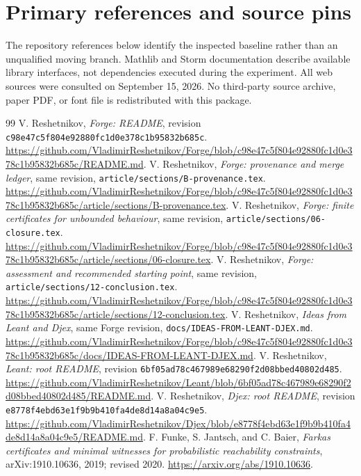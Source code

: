 \documentclass[11pt,letterpaper]{article}
\theoremstyle{definition}\newtheorem{definition}[theorem]{Definition}
\theoremstyle{remark}\newtheorem{remark}[theorem]{Remark}
\newcommand{\code}[1]{\texttt{#1}}
\begin{document}
\section{Primary references and source pins}
The repository references below identify the inspected baseline rather than an unqualified moving branch. Mathlib and Storm documentation describe available library interfaces, not dependencies executed during the experiment. All web sources were consulted on September 15, 2026. No third-party source archive, paper PDF, or font file is redistributed with this package.

\begingroup\small
\begin{thebibliography}{99}
 V. Reshetnikov, \emph{Forge: README}, revision \code{c98e47c5f804e92880fc1d0e378c1b95832b685c}. \url{https://github.com/VladimirReshetnikov/Forge/blob/c98e47c5f804e92880fc1d0e378c1b95832b685c/README.md}.
 V. Reshetnikov, \emph{Forge: provenance and merge ledger}, same revision, \code{article/sections/B-provenance.tex}. \url{https://github.com/VladimirReshetnikov/Forge/blob/c98e47c5f804e92880fc1d0e378c1b95832b685c/article/sections/B-provenance.tex}.
 V. Reshetnikov, \emph{Forge: finite certificates for unbounded behaviour}, same revision, \code{article/sections/06-closure.tex}. \url{https://github.com/VladimirReshetnikov/Forge/blob/c98e47c5f804e92880fc1d0e378c1b95832b685c/article/sections/06-closure.tex}.
 V. Reshetnikov, \emph{Forge: assessment and recommended starting point}, same revision, \code{article/sections/12-conclusion.tex}. \url{https://github.com/VladimirReshetnikov/Forge/blob/c98e47c5f804e92880fc1d0e378c1b95832b685c/article/sections/12-conclusion.tex}.
 V. Reshetnikov, \emph{Ideas from Leant and Djex}, same Forge revision, \code{docs/IDEAS-FROM-LEANT-DJEX.md}. \url{https://github.com/VladimirReshetnikov/Forge/blob/c98e47c5f804e92880fc1d0e378c1b95832b685c/docs/IDEAS-FROM-LEANT-DJEX.md}.
 V. Reshetnikov, \emph{Leant: root README}, revision \code{6bf05ad78c467989e68290f2d08bbed40802d485}. \url{https://github.com/VladimirReshetnikov/Leant/blob/6bf05ad78c467989e68290f2d08bbed40802d485/README.md}.
 V. Reshetnikov, \emph{Djex: root README}, revision \code{e8778f4ebd63e1f9b9b410fa4de8d14a8a04c9e5}. \url{https://github.com/VladimirReshetnikov/Djex/blob/e8778f4ebd63e1f9b9b410fa4de8d14a8a04c9e5/README.md}.
 F. Funke, S. Jantsch, and C. Baier, \emph{Farkas certificates and minimal witnesses for probabilistic reachability constraints}, arXiv:1910.10636, 2019; revised 2020. \url{https://arxiv.org/abs/1910.10636}.

\end{thebibliography}
\end{document}

